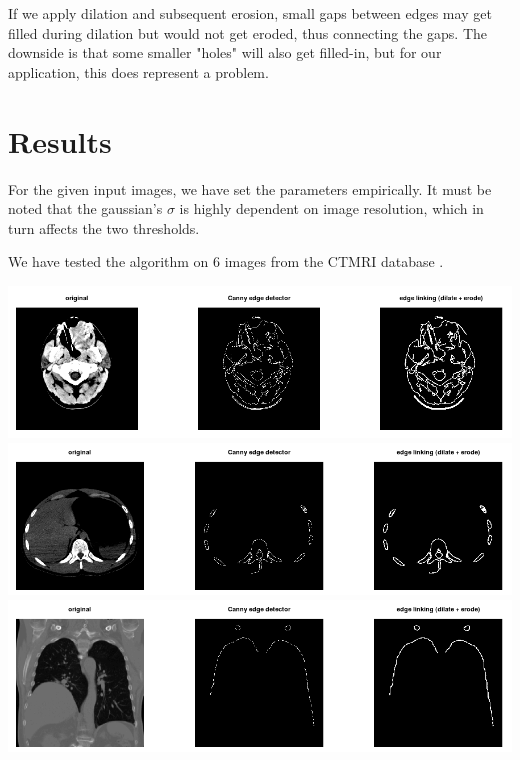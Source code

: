 \documentclass[fleqn,moreauthors,10pt]{ds_report}
\begin{document}
If we apply dilation and subsequent erosion, small gaps between edges may get filled during dilation but would not get eroded, thus connecting the gaps. The downside is that some smaller "holes" will also get filled-in, but for our application, this does represent a problem.

\section*{Results}

For the given input images, we have set the parameters empirically. It must be noted that the gaussian's $\sigma$ is highly dependent on image resolution, which in turn affects the two thresholds.

We have tested the algorithm on 6 images from the CTMRI database \cite{ctmri}.

\vspace{1em}\noindent
\includegraphics[width=\linewidth]{001.png}
\includegraphics[width=\linewidth]{002.png}
\includegraphics[width=\linewidth]{003.png}
\end{document}
